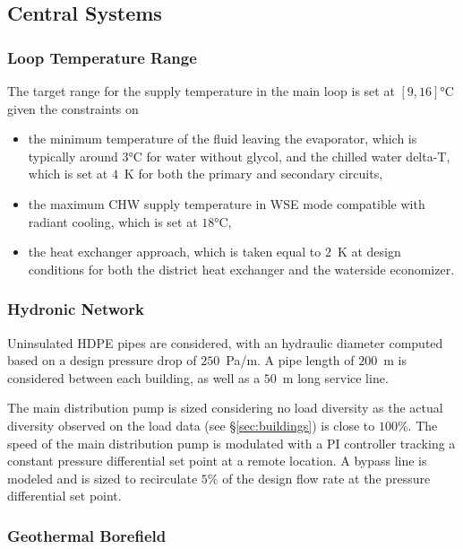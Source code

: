 \subsection{Central Systems}

\subsubsection{Loop Temperature Range} \label{sec:loop_range}

The target range for the supply temperature in the main loop is set at $[9, 16]$°C given the constraints on

\begin{itemize}
    \item the minimum temperature of the fluid leaving the evaporator, which is typically around $3$°C for water without glycol, and the chilled water delta-T, which is set at $4$~K for both the primary and secondary circuits,
    \item the maximum CHW supply temperature in WSE mode compatible with radiant cooling, which is set at $18$°C,
    \item the heat exchanger approach, which is taken equal to $2$~K at design conditions for both the district heat exchanger and the waterside economizer.
\end{itemize}


\subsubsection{Hydronic Network} \label{sec:network}

Uninsulated HDPE pipes are considered, with an hydraulic diameter computed based on a design pressure drop of $250$~Pa/m. A pipe length of $200$~m is considered between each building, as well as a $50$~m long service line.

The main distribution pump is sized considering no load diversity as the actual diversity observed on the load data (see §\ref{sec:buildings}) is close to $100\%$.
The speed of the main distribution pump is modulated with a PI controller tracking a constant pressure differential set point at a remote location. A bypass line is modeled and is sized to recirculate $5\%$ of the design flow rate at the pressure differential set point.


\subsubsection{Geothermal Borefield} \label{sec:geo}

